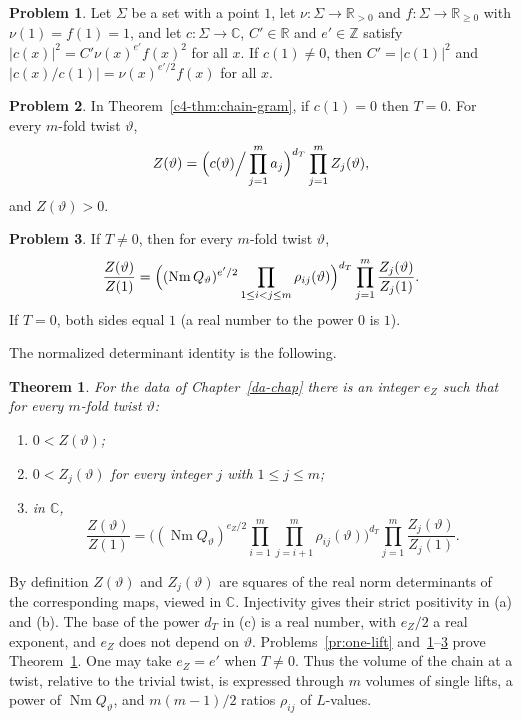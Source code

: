\documentclass[reqno]{amsart}
\newcounter{chap}
\theoremstyle{definition}
\newtheorem{problem}{Problem}[section]
\theoremstyle{plain}
\newtheorem{theorem}{Theorem}[section]
\newcommand{\Z}{\mathbb Z}
\newcommand{\R}{\mathbb R}
\newcommand{\C}{\mathbb C}
\newcommand{\Nm}{\operatorname{Nm}}
\begin{document}
\begin{problem}\label{pr:abs-ratio}
Let \(\Sigma\) be a set with a point \(1\), let \(\nu \colon \Sigma \to \R_{>0}\) and \(f \colon \Sigma \to \R_{\ge 0}\) with \(\nu(1) = f(1) = 1\), and let \(c \colon \Sigma \to \C\), \(C' \in \R\) and \(e' \in \Z\) satisfy \(\lvert c(x) \rvert^2 = C' \nu(x)^{e'} f(x)^2\) for all \(x\).  If \(c(1) \ne 0\), then \(C' = \lvert c(1)\rvert^2\) and \(\lvert c(x)/c(1) \rvert = \nu(x)^{e'/2} f(x)\) for all \(x\).
\end{problem}

\begin{problem}\label{pr:chain-det}
In Theorem~\ref{c4-thm:chain-gram}, if \(c(1) = 0\) then \(T = 0\).  For every \(m\)-fold twist \(\vartheta\),
\[
  Z(\vartheta) = \Bigl( c(\vartheta) \Big/ \prod_{j=1}^m a_j \Bigr)^{d_T} \prod_{j=1}^m Z_j(\vartheta) ,
\]
and \(Z(\vartheta) > 0\).
\end{problem}

\begin{problem}\label{pr:quotient}
If \(T \ne 0\), then for every \(m\)-fold twist \(\vartheta\),
\[
  \frac{Z(\vartheta)}{Z(1)} = \Bigl( (\Nm Q_\vartheta)^{e'/2} \prod_{1 \le i < j \le m} \rho_{ij}(\vartheta) \Bigr)^{d_T} \prod_{j=1}^m \frac{Z_j(\vartheta)}{Z_j(1)} .
\]
If \(T = 0\), both sides equal \(1\) (a real number to the power \(0\) is \(1\)).
\end{problem}

The normalized determinant identity is the following.

\begin{theorem}\label{thm:main}
For the data of Chapter~\ref{da-chap} there is an integer \(e_Z\) such that for every \(m\)-fold twist \(\vartheta\):
\begin{enumerate}
\item[(a)] \(0 < Z(\vartheta)\);
\item[(b)] \(0 < Z_j(\vartheta)\) for every integer \(j\) with \(1 \le j \le m\);
\item[(c)] in \(\C\),
\[
  \frac{Z(\vartheta)}{Z(1)} = \biggl( (\Nm Q_\vartheta)^{e_Z/2} \prod_{i=1}^{m} \prod_{j=i+1}^{m} \rho_{ij}(\vartheta) \biggr)^{d_T} \prod_{j=1}^m \frac{Z_j(\vartheta)}{Z_j(1)} .
\]
\end{enumerate}
\end{theorem}

By definition \(Z(\vartheta)\) and \(Z_j(\vartheta)\) are squares of the real norm determinants of the corresponding maps, viewed in \(\C\).  Injectivity gives their strict positivity in (a) and (b).  The base of the power \(d_T\) in (c) is a real number, with \(e_Z/2\) a real exponent, and \(e_Z\) does not depend on \(\vartheta\).  Problems~\ref{pr:one-lift} and~\ref{pr:abs-ratio}--\ref{pr:quotient} prove Theorem~\ref{thm:main}.  One may take \(e_Z = e'\) when \(T \ne 0\).  Thus the volume of the chain at a twist, relative to the trivial twist, is expressed through \(m\) volumes of single lifts, a power of \(\Nm Q_\vartheta\), and \(m(m-1)/2\) ratios \(\rho_{ij}\) of \(L\)-values.
\end{document}
